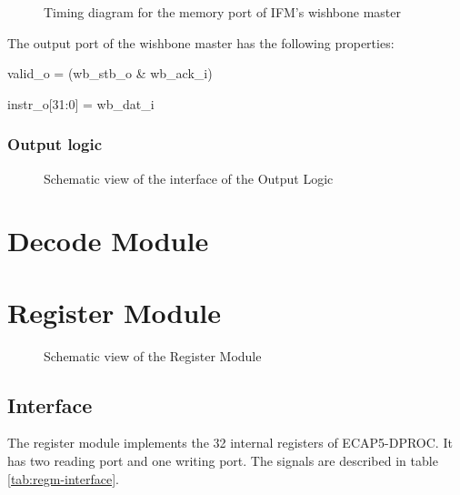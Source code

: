 

\begin{figure}[H]
  \centering
  
  \caption{Timing diagram for the memory port of IFM's wishbone master}
  \label{fig:ifm-wishbone-read}
\end{figure}

\begin{content}
  The output port of the wishbone master has the following properties:
  \begin{center}
    valid\_o = (wb\_stb\_o \& wb\_ack\_i)

    instr\_o[31:0] = wb\_dat\_i
  \end{center}
\end{content}

\subsubsection{Output logic}

\begin{figure}[H]
    \centering
    
    \caption{Schematic view of the interface of the Output Logic}
    \label{fig:ifm-output-logic}
\end{figure}

\newpage
\section{Decode Module}
\newpage

\section{Register Module}

\begin{figure}[h!]
    \centering
    
    \caption{Schematic view of the Register Module}
    \label{fig:regm}
\end{figure}

\subsection{Interface}

\begin{content}
The register module implements the 32 internal registers of ECAP5-DPROC. It has two reading port and one writing port. The signals are described in table \ref{tab:regm-interface}. 
\end{content}

